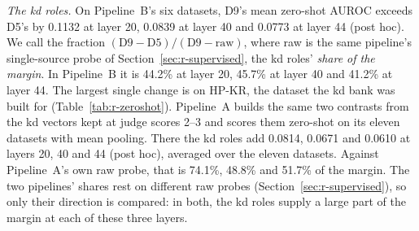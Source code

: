 \emph{The kd roles.} On Pipeline~B's six datasets, D9's mean zero-shot AUROC exceeds D5's by 0.1132 at layer 20, 0.0839 at layer 40 and 0.0773 at layer 44 (post hoc). %
We call the fraction $(\text{D9}-\text{D5})/(\text{D9}-\text{raw})$, where raw is the same pipeline's single-source probe of Section~\ref{sec:r-supervised}, the kd roles' \emph{share of the margin}.
In Pipeline~B it is 44.2\% at layer 20, 45.7\% at layer 40 and 41.2\% at layer 44. %
The largest single change is on HP-KR, the dataset the kd bank was built for (Table~\ref{tab:r-zeroshot}). %
Pipeline~A builds the same two contrasts from the kd vectors kept at judge scores 2--3 and scores them zero-shot on its eleven datasets with mean pooling. %
There the kd roles add 0.0814, 0.0671 and 0.0610 at layers 20, 40 and 44 (post hoc), averaged over the eleven datasets. %
Against Pipeline~A's own raw probe, that is 74.1\%, 48.8\% and 51.7\% of the margin. %
The two pipelines' shares rest on different raw probes (Section~\ref{sec:r-supervised}), so only their direction is compared: in both, the kd roles supply a large part of the margin at each of these three layers. %
